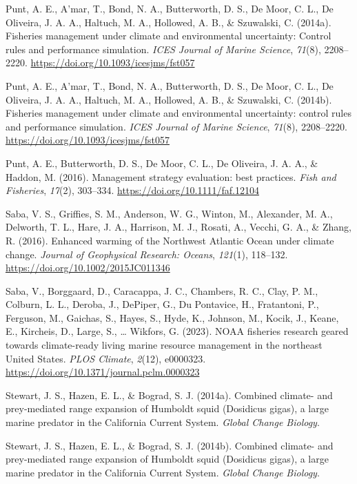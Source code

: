 \documentclass[
  12pt,
]{article}
\newlength{\cslhangindent}
\newenvironment{CSLReferences}[2] %
 {\begin{list}{}{%
  \setlength{\itemindent}{0pt}
  \setlength{\leftmargin}{0pt}
  \setlength{\parsep}{0pt}
  \ifodd #1
   \setlength{\leftmargin}{\cslhangindent}
   \setlength{\itemindent}{-1\cslhangindent}
  \fi
  \setlength{\itemsep}{#2\baselineskip}}}
 {\end{list}}
\begin{document}
\begin{CSLReferences}{1}{2}
Punt, A. E., A'mar, T., Bond, N. A., Butterworth, D. S., De Moor, C. L., De Oliveira, J. A. A., Haltuch, M. A., Hollowed, A. B., \& Szuwalski, C. (2014a). Fisheries management under climate and environmental uncertainty: Control rules and performance simulation. \emph{ICES Journal of Marine Science}, \emph{71}(8), 2208--2220. \url{https://doi.org/10.1093/icesjms/fst057}

Punt, A. E., A'mar, T., Bond, N. A., Butterworth, D. S., De Moor, C. L., De Oliveira, J. A. A., Haltuch, M. A., Hollowed, A. B., \& Szuwalski, C. (2014b). Fisheries management under climate and environmental uncertainty: control rules and performance simulation. \emph{ICES Journal of Marine Science}, \emph{71}(8), 2208--2220. \url{https://doi.org/10.1093/icesjms/fst057}

Punt, A. E., Butterworth, D. S., De Moor, C. L., De Oliveira, J. A. A., \& Haddon, M. (2016). Management strategy evaluation: best practices. \emph{Fish and Fisheries}, \emph{17}(2), 303--334. \url{https://doi.org/10.1111/faf.12104}

Saba, V. S., Griffies, S. M., Anderson, W. G., Winton, M., Alexander, M. A., Delworth, T. L., Hare, J. A., Harrison, M. J., Rosati, A., Vecchi, G. A., \& Zhang, R. (2016). Enhanced warming of the Northwest Atlantic Ocean under climate change. \emph{Journal of Geophysical Research: Oceans}, \emph{121}(1), 118--132. \url{https://doi.org/10.1002/2015JC011346}

Saba, V., Borggaard, D., Caracappa, J. C., Chambers, R. C., Clay, P. M., Colburn, L. L., Deroba, J., DePiper, G., Du Pontavice, H., Fratantoni, P., Ferguson, M., Gaichas, S., Hayes, S., Hyde, K., Johnson, M., Kocik, J., Keane, E., Kircheis, D., Large, S., \ldots{} Wikfors, G. (2023). NOAA fisheries research geared towards climate-ready living marine resource management in the northeast United States. \emph{PLOS Climate}, \emph{2}(12), e0000323. \url{https://doi.org/10.1371/journal.pclm.0000323}

Stewart, J. S., Hazen, E. L., \& Bograd, S. J. (2014a). Combined climate{-} and prey{-}mediated range expansion of Humboldt squid (Dosidicus gigas), a large marine predator in the California Current System. \emph{Global Change Biology}.

Stewart, J. S., Hazen, E. L., \& Bograd, S. J. (2014b). Combined climate- and prey-mediated range expansion of {Humboldt} squid ({Dosidicus} gigas), a large marine predator in the {California Current System}. \emph{Global Change Biology}.


\end{CSLReferences}
\end{document}
